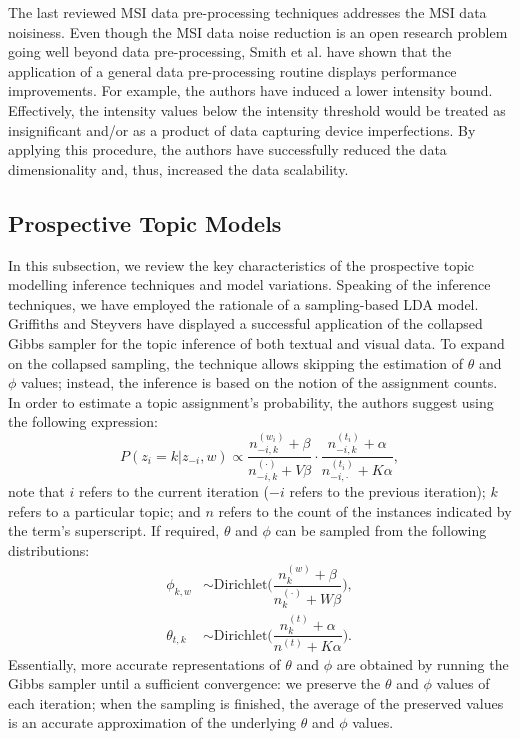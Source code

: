 \documentclass{mpaper}
\begin{document}
\par The last reviewed MSI data pre-processing techniques addresses the MSI data noisiness. Even though the MSI data noise reduction is an open research problem going well beyond data pre-processing, Smith et al. \cite{smith2014proteomics} have shown that the application of a general data pre-processing routine displays performance improvements. For example, the authors have induced a lower intensity bound. Effectively, the intensity values below the intensity threshold would be treated as insignificant and/or as a product of data capturing device imperfections. By applying this procedure, the authors have successfully reduced the data dimensionality and, thus, increased the data scalability.

\subsection{Prospective Topic Models}

\par In this subsection, we review the key characteristics of the prospective topic modelling inference techniques and model variations. Speaking of the inference techniques, we have employed the rationale of a sampling-based LDA model. Griffiths and Steyvers \cite{griffiths2004finding} have displayed a successful application of the collapsed Gibbs sampler for the topic inference of both textual and visual data. To expand on the collapsed sampling, the technique allows skipping the estimation of $\theta$ and $\phi$ values; instead, the inference is based on the notion of the assignment counts. In order to estimate a topic assignment's probability, the authors suggest using the following expression:
\begin{equation}
P(z_i = k | z_{-i}, w) \propto \dfrac{n_{-i, k}^{(w_i)} + \beta}{n_{-i, k}^{(\cdot)} + V\beta}\cdot \dfrac{n_{-i, k}^{(t_i)} + \alpha}{n_{-i, \cdot}^{(t_i)} + K\alpha},
\end{equation}
note that $i$ refers to the current iteration ($-i$ refers to the previous iteration); $k$ refers to a particular topic; and $n$ refers to the count of the instances indicated by the term's superscript. If required, $\theta$ and $\phi$ can be sampled from the following distributions:
\begin{align}
\phi_{k,w} & \sim \mbox{Dirichlet}\bigg(\dfrac{n_{k}^{(w)} + \beta}{n_{k}^{(\cdot)} + W\beta}\bigg),\\
\theta_{t,k} & \sim \mbox{Dirichlet}\bigg(\dfrac{n_{k}^{(t)} + \alpha}{n^{(t)} + K\alpha}\bigg).
\end{align}
Essentially, more accurate representations of $\theta$ and $\phi$ are obtained by running the Gibbs sampler until a sufficient convergence: we preserve the $\theta$ and $\phi$ values of each iteration; when the sampling is finished, the average of the preserved values is an accurate approximation of the underlying $\theta$ and $\phi$ values.
\end{document}
